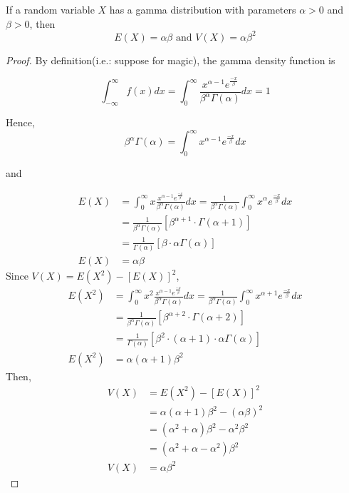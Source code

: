 \begin{theorem}
    If a random variable $X$ has a gamma distribution with parameters $\alpha > 0$  and $\beta > 0$, then
    \[
    E(X) = \alpha\beta \text{ and } V(X) = \alpha\beta^2
    \]
\end{theorem}

\begin{proof}
    By definition(i.e.: suppose for magic), the gamma density function is

    \[
        \int^\infty_{-\infty} f(x) dx 
        = \int^\infty_0 \frac{x^{\alpha - 1}e^{\frac{-x}{\beta}}}{\beta^\alpha\Gamma(\alpha)} dx = 1
    \]

    Hence,
    \[
        \beta^\alpha\Gamma(\alpha) 
        = 
        \int^\infty_0 x^{\alpha - 1}e^{\frac{-x}{\beta}} dx
    \]

    and

    \begin{align*}
        E(X) &= \int^\infty_0 x\frac{x^{\alpha - 1}e^{\frac{-x}{\beta}}}{\beta^\alpha\Gamma(\alpha)} dx 
        = \frac{1}{\beta^\alpha\Gamma(\alpha)} \int^\infty_0 x^\alpha e^{\frac{-x}{\beta}} dx \\
        &= \frac{1}{\beta^\alpha\Gamma(\alpha)} \left[\beta^{\alpha + 1} \cdot \Gamma(\alpha + 1)\right] \\
        &= \frac{1}{\Gamma(\alpha)} \left[\beta \cdot \alpha \Gamma(\alpha)\right] \\
        E(X) &= \alpha\beta
    \end{align*}
    Since $V(X) = E(X^2) - [E(X)]^2$,
    \begin{align*}
        E(X^2) &= \int^\infty_0 x^2\frac{x^{\alpha - 1}e^{\frac{-x}{\beta}}}{\beta^\alpha\Gamma(\alpha)} dx 
        = \frac{1}{\beta^\alpha\Gamma(\alpha)} \int^\infty_0 x^{\alpha + 1} e^{\frac{-x}{\beta}} dx \\
        &= \frac{1}{\beta^\alpha\Gamma(\alpha)} \left[\beta^{\alpha + 2} \cdot \Gamma(\alpha + 2)\right] \\
        &= \frac{1}{\Gamma(\alpha)} \left[\beta^2 \cdot (\alpha + 1)\cdot \alpha \Gamma(\alpha)\right] \\
        E(X^2) &= \alpha(\alpha+1)\beta^2
    \end{align*}
    Then,
    \begin{align*}
        V(X) &= E(X^2) - [E(X)]^2 \\
        &= \alpha(\alpha+1)\beta^2 - (\alpha\beta)^2 \\
        &= (\alpha^2 + \alpha)\beta^2 - \alpha^2\beta^2 \\
        &= (\alpha^2 + \alpha -  \alpha^2)\beta^2 \\
        V(X) &= \alpha\beta^2
    \end{align*}
\end{proof}
